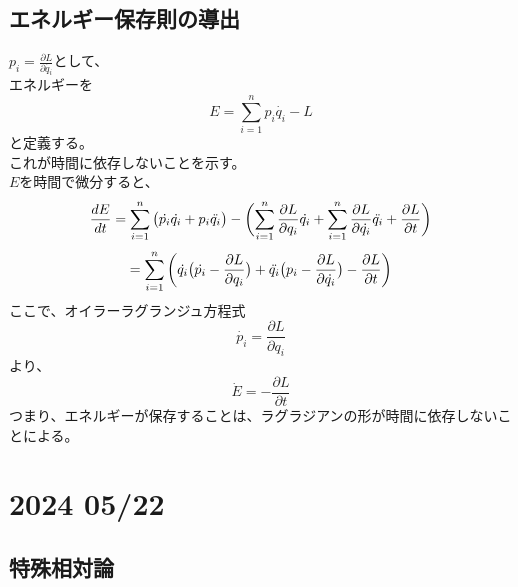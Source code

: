 \documentclass[dvipdfmx]{report} %
\begin{document}
\section{
    エネルギー保存則の導出
}
$p_i = \frac{\partial L}{\partial \dot{q_i}}$として、\\
エネルギーを
$$
E = \sum_{i=1}^{n}{p_i \dot{q_i} - L}
$$
と定義する。\\
これが時間に依存しないことを示す。\\
$E$を時間で微分すると、
$$
\frac{dE}{dt} =
\sum_{i=1}^{n}
{\bigl{(} \dot{p_i} \dot{q_i} + p_i \ddot{q_i} \bigr{)} } -
\biggl{(}
\sum_{i=1}^{n}{ \frac{\partial{L}}{\partial{q_i}} \dot{q_i} } +
\sum_{i=1}^{n}{ \frac{\partial{L}}{\partial{\dot{q_i}}} \ddot{q_i} } + 
\frac{\partial{L}}{\partial{t}}
\biggr{)}
$$
$$
= \sum_{i=1}^{n}{\biggl{(}
\dot{q_i}\bigl{(} \dot{p_i} - \frac{\partial{L}}{\partial{q_i}} \bigr{)} +
\ddot{q_i}\bigl{(} p_i - \frac{\partial{L}}{\partial{\dot{q_i}}} \bigr{)} -
\frac{\partial{L}}{\partial{t}}
\biggr{)}}
$$
ここで、オイラーラグランジュ方程式
$$
\dot{p_i} = \frac{\partial{L}}{\partial{q_i}}
$$
より、
$$
\dot{E} = - \frac{\partial{L}}{\partial{t}}
$$
つまり、エネルギーが保存することは、ラグラジアンの形が時間に依存しないことによる。


\chapter{2024 05/22}

\section{
    特殊相対論
}
\end{document}
